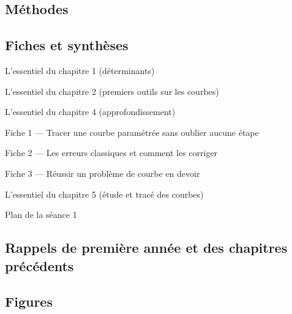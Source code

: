 \documentclass[a4paper,11pt]{article}
\makeatletter
\numberwithin{equation}{section}
\numberwithin{figure}{section}
\numberwithin{table}{section}
\theoremstyle{enonce}
\theoremstyle{exemple}
\theoremstyle{remarque}
\newcommand{\listemethodes}{\@starttoc{met}}
\newcommand{\listerappels}{\@starttoc{rap}}
\makeatother
\begin{document}
\subsection*{Méthodes}
{\small\listemethodes}

\subsection*{Fiches et synthèses}
{\small
\noindent L'essentiel du chapitre 1 (déterminants)\dotfill\pageref{ess:1}\par
\noindent L'essentiel du chapitre 2 (premiers outils sur les courbes)\dotfill\pageref{ess:2}\par
\noindent L'essentiel du chapitre 4 (approfondissement)\dotfill\pageref{ess:4}\par
\noindent Fiche 1 --- Tracer une courbe paramétrée sans oublier aucune étape\dotfill\pageref{fiche:1}\par
\noindent Fiche 2 --- Les erreurs classiques et comment les corriger\dotfill\pageref{fiche:2}\par
\noindent Fiche 3 --- Réussir un problème de courbe en devoir\dotfill\pageref{fiche:3}\par
\noindent L'essentiel du chapitre 5 (étude et tracé des courbes)\dotfill\pageref{ess:5}\par
\noindent Plan de la séance 1\dotfill\pageref{plan:seance}\par}

\subsection*{Rappels de première année et des chapitres précédents}
{\small\listerappels}

\subsection*{Figures}
{\small\makeatletter{}\makeatother}
\end{document}
